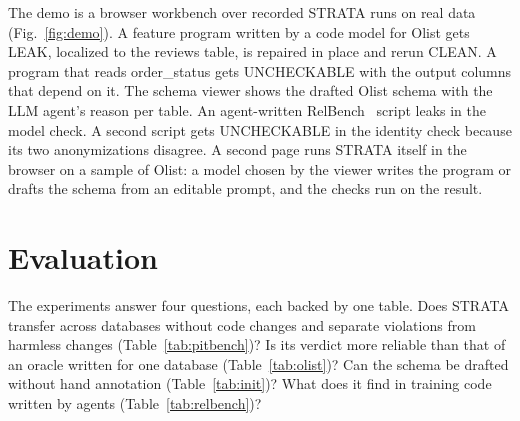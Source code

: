 \documentclass[10pt,conference]{IEEEtran}
\newcommand{\tool}{STRATA}
\begin{document}
The demo is a browser workbench over recorded \tool{} runs on real data
(Fig.~\ref{fig:demo}). A feature program written by a code model for Olist
gets LEAK, localized to the reviews table, is repaired in place and rerun
CLEAN. A program that reads order\_status gets UNCHECKABLE with the output
columns that depend on it. The schema viewer shows the drafted Olist schema
with the LLM agent's reason per table. An agent-written
RelBench~\cite{relbench} script leaks in the model check. A second script
gets UNCHECKABLE in the identity check because its two anonymizations
disagree.
A second page runs \tool{} itself in the browser on a sample of Olist: a
model chosen by the viewer writes the program or drafts the schema from an
editable prompt, and the checks run on the result.

\section{Evaluation}
\label{sec:eval}

The experiments answer four questions, each backed by one table. Does
\tool{} transfer across databases without code changes and separate
violations from harmless changes (Table~\ref{tab:pitbench})? Is its verdict
more reliable than that of an oracle written for one database
(Table~\ref{tab:olist})? Can the schema be drafted without hand annotation
(Table~\ref{tab:init})? What does it find in training code written by
agents (Table~\ref{tab:relbench})?
\end{document}

